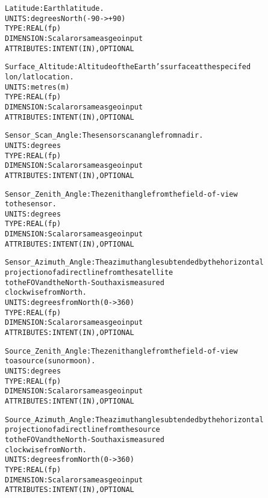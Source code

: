 \begin{alltt}
        Latitude:             Earth latitude.
                              UNITS:      degrees North (-90->+90)
                              TYPE:       REAL(fp)
                              DIMENSION:  Scalar or same as geo input
                              ATTRIBUTES: INTENT(IN), OPTIONAL
 
        Surface_Altitude:     Altitude of the Earth's surface at the specifed
                              lon/lat location.
                              UNITS:      metres (m)
                              TYPE:       REAL(fp)
                              DIMENSION:  Scalar or same as geo input
                              ATTRIBUTES: INTENT(IN), OPTIONAL
 
        Sensor_Scan_Angle:    The sensor scan angle from nadir.
                              UNITS:      degrees
                              TYPE:       REAL(fp)
                              DIMENSION:  Scalar or same as geo input
                              ATTRIBUTES: INTENT(IN), OPTIONAL
 
        Sensor_Zenith_Angle:  The zenith angle from the field-of-view
                              to the sensor.
                              UNITS:      degrees
                              TYPE:       REAL(fp)
                              DIMENSION:  Scalar or same as geo input
                              ATTRIBUTES: INTENT(IN), OPTIONAL
 
        Sensor_Azimuth_Angle: The azimuth angle subtended by the horizontal
                              projection of a direct line from the satellite
                              to the FOV and the North-South axis measured
                              clockwise from North.
                              UNITS:      degrees from North (0->360) 
                              TYPE:       REAL(fp)
                              DIMENSION:  Scalar or same as geo input
                              ATTRIBUTES: INTENT(IN), OPTIONAL
 
        Source_Zenith_Angle:  The zenith angle from the field-of-view
                              to a source (sun or moon).
                              UNITS:      degrees
                              TYPE:       REAL(fp)
                              DIMENSION:  Scalar or same as geo input
                              ATTRIBUTES: INTENT(IN), OPTIONAL
 
        Source_Azimuth_Angle: The azimuth angle subtended by the horizontal
                              projection of a direct line from the source
                              to the FOV and the North-South axis measured
                              clockwise from North.
                              UNITS:      degrees from North (0->360) 
                              TYPE:       REAL(fp)
                              DIMENSION:  Scalar or same as geo input
                              ATTRIBUTES: INTENT(IN), OPTIONAL
 

\end{alltt}

